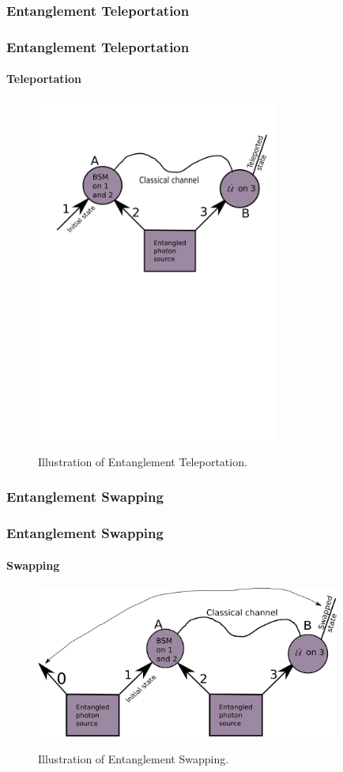 \documentclass[serif,8pt]{beamer}
\begin{document}
\subsubsection{Entanglement Teleportation}
\begin{frame}[t]
    \frametitle{Entanglement Teleportation}
    \framesubtitle{Teleportation}
    \begin{figure}[]
      \centering
      \caption{Illustration of Entanglement Teleportation.}
      \includegraphics[width=8cm]{EntanglementTeleportation.png}
	\label{fig:Tele}
    \end{figure}
\end{frame}



\subsubsection{Entanglement Swapping}
\addtocounter{framenumber}{-1}
\begin{frame}[t]
    \frametitle{Entanglement Swapping}
    \framesubtitle{Swapping}
\begin{figure}[]
      \centering
      \caption{Illustration of Entanglement Swapping.}
      \includegraphics[width=10cm]{EntanglementSwapping.png}
	\label{fig:Swap}
    \end{figure}
\end{frame}
\end{document}
